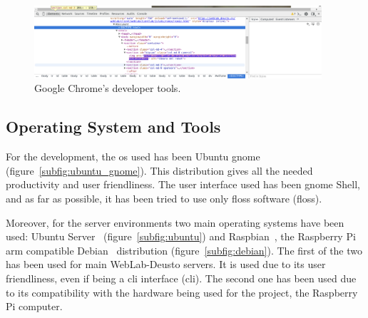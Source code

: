 \begin{figure}[!htbp]
	\centering
	\includegraphics[width=0.95\textwidth]{fig/chrome-dev}
	\caption{Google Chrome's developer tools.}
	\label{fig:chrome_dev}
\end{figure}

\subsection{Operating System and Tools}

For the development, the \acrlong{os} used has been Ubuntu \acrshort{gnome}~\cite{ubuntu_gnome_web}
(figure~\ref{subfig:ubuntu_gnome}). This distribution gives all the needed productivity and user
friendliness. The user interface used has been \acrshort{gnome} Shell, and as far as possible, it
has been tried to use only \acrshort{floss} software (\acrlong{floss}).

Moreover, for the server environments two main operating systems have been used: Ubuntu
Server~\cite{ubuntu_web} (figure~\ref{subfig:ubuntu}) and Raspbian~\cite{raspbian_web}, the
Raspberry Pi \acrshort{arm} compatible Debian~\cite{debian_web} distribution
(figure~\ref{subfig:debian}). The first of the two has been used for main WebLab-Deusto servers. It
is used due to its user friendliness, even if being a \acrshort{cli} interface (\acrlong{cli}). The
second one has been used due to its compatibility with the hardware being used for the project, the
Raspberry Pi computer.

